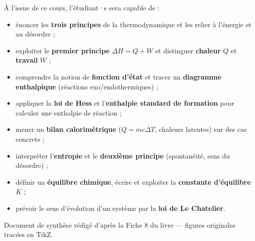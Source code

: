 \documentclass[11pt,a4paper]{article}
\newcommand{\dH}{\Delta H}
\begin{document}
\begin{tcolorbox}[boxbase,colback=primary!5,colframe=primary,width=15.5cm,
    title={\textsc{Objectifs pédagogiques de la fiche}}]
À l'issue de ce cours, l'étudiant·e sera capable de :
\begin{itemize}[leftmargin=1.6em,topsep=2pt,itemsep=1pt]
  \item énoncer les \textbf{trois principes} de la thermodynamique et les relier à l'énergie et au désordre ;
  \item exploiter le \textbf{premier principe} $\dH=Q+W$ et distinguer \textbf{chaleur} $Q$ et \textbf{travail} $W$ ;
  \item comprendre la notion de \textbf{fonction d'état} et tracer un \textbf{diagramme enthalpique} (réactions exo/endothermiques) ;
  \item appliquer la \textbf{loi de Hess} et l'\textbf{enthalpie standard de formation} pour calculer une enthalpie de réaction ;
  \item mener un \textbf{bilan calorimétrique} ($Q=mc\Delta T$, chaleurs latentes) sur des cas concrets ;
  \item interpréter l'\textbf{entropie} et le \textbf{deuxième principe} (spontanéité, sens du désordre) ;
  \item définir un \textbf{équilibre chimique}, écrire et exploiter la \textbf{constante d'équilibre} $K$ ;
  \item prévoir le sens d'évolution d'un système par la \textbf{loi de Le Chatelier}.
\end{itemize}
\end{tcolorbox}

\vspace{0.5cm}
{\small\color{black!60} Document de synthèse rédigé d'après la Fiche 8 du livre — figures originales tracées en TikZ.}
\par
\endgroup

\newpage
\renewcommand{\contentsname}{\textcolor{primarydark}{Table des matières}}
\tableofcontents
\thispagestyle{fancy}
\newpage

\end{document}

